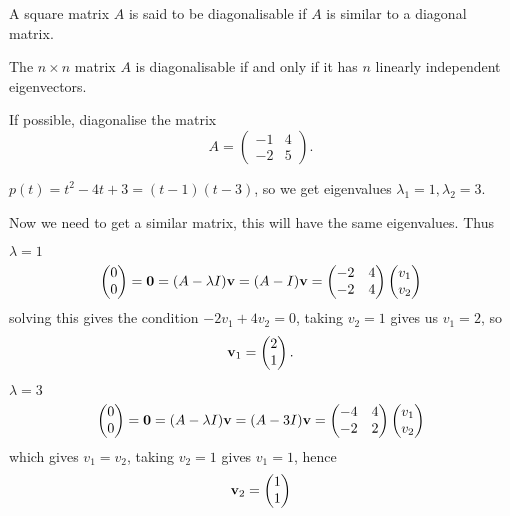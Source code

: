 \documentclass[10pt, a4paper]{article}
\begin{document}
\begin{definition}
    A square matrix $A$ is said to be diagonalisable if $A$ is similar to a diagonal matrix.
\end{definition}

\begin{proposition}
    The $n \times n$ matrix $A$ is diagonalisable if and only if it has $n$ linearly independent eigenvectors.
\end{proposition}

\begin{example}
    If possible,
    diagonalise the matrix
    \[
    A = \begin{pmatrix}
        -1 & 4 \\ -2 & 5
    \end{pmatrix}.
    \]
    \begin{solution}
        $p(t) = t ^ 2 - 4t + 3 = (t - 1)(t - 3)$,
        so we get eigenvalues $\lambda_1 = 1, \lambda_2 = 3$.

        Now we need to get a similar matrix,
        this will have the same eigenvalues.
        Thus

        $\lambda = 1$
        \[
        \begin{pmatrix}
            0 \\ 0
        \end{pmatrix}
        = \mathbf{0} = (A - \lambda I)\mathbf{v} = (A - I)\mathbf{v} = \begin{pmatrix}
            -2 & 4 \\ -2 & 4
        \end{pmatrix}\begin{pmatrix}
            v_1 \\ v_2
        \end{pmatrix}
        \]
        solving this gives the condition $-2v_1 + 4v_2 = 0$,
        taking $v_2 = 1$ gives us $v_1 = 2$,
        so
        \[
        \mathbf{v}_1 = \begin{pmatrix}
            2 \\ 1
        \end{pmatrix}.
        \]
        
        $\lambda = 3$
        \[
        \begin{pmatrix}
            0 \\ 0
        \end{pmatrix}
        = \mathbf{0} = (A - \lambda I)\mathbf{v} = (A - 3I)\mathbf{v} = \begin{pmatrix}
            -4 & 4 \\ -2 & 2
        \end{pmatrix}\begin{pmatrix}
            v_1 \\ v_2
        \end{pmatrix}
        \]
        which gives $v_1 = v_2$,
        taking $v_2 = 1$ gives $v_1 = 1$,
        hence
        \[
        \mathbf{v}_2 = \begin{pmatrix}
            1 \\ 1
        \end{pmatrix}
        \]


\end{solution}
\end{example}
\end{document}
